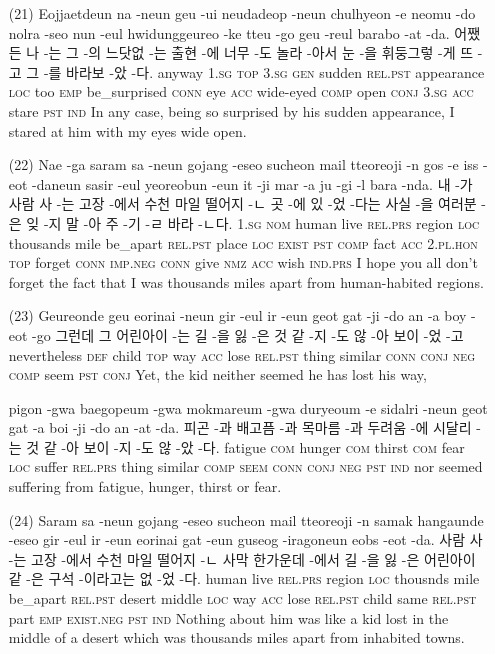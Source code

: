 \begin{itemize}
\item [(21)]
\tgl
		{Eojjaetdeun na -neun geu -ui neudadeop -neun chulhyeon -e neomu -do nolra -seo nun -eul hwidunggeureo -ke tteu -go geu -reul barabo -at -da.}
		{어쨌든 나 -는 그 -의 느닷없 -는 출현 -에 너무 -도 놀라 -아서 눈 -을 휘둥그렇 -게 뜨 -고 그 -를 바라보 -았 -다.}
		{anyway	\textsc{1.sg}	\textsc{top}	\textsc{3.sg}	\textsc{gen}	sudden	\textsc{rel.pst}	appearance	\textsc{loc}	too	\textsc{emp}	be\_surprised	\textsc{conn}	eye	\textsc{acc}	wide-eyed	\textsc{comp}	open	\textsc{conj}	\textsc{3.sg}	\textsc{acc}	stare	\textsc{pst}	\textsc{ind}}
		{In any case, being so surprised by his sudden appearance, I stared at him with my eyes wide open.}
		
\item [(22)]
\tgl
		{Nae -ga saram sa -neun gojang -eseo sucheon mail tteoreoji -n gos -e iss -eot -daneun sasir -eul yeoreobun -eun it -ji mar -a ju -gi -l bara -nda.}
		{내 -가 사람 사 -는 고장 -에서 수천 마일 떨어지 -ㄴ 곳 -에 있 -었 -다는 사실 -을 여러분 -은 잊 -지 말 -아 주 -기 -ㄹ 바라 -ㄴ다.}
		{\textsc{1.sg}	\textsc{nom}	human	live	\textsc{rel.prs}	region	\textsc{loc}	thousands	mile	be\_apart	\textsc{rel.pst}	place	\textsc{loc}	\textsc{exist}	\textsc{pst}	\textsc{comp}	fact	\textsc{acc}	\textsc{2.pl.hon}	\textsc{top}	forget	\textsc{conn}	\textsc{imp.neg}	\textsc{conn}	give	\textsc{nmz}	\textsc{acc}	wish	\textsc{ind.prs}}
		{I hope you all don't forget the fact that I was thousands miles apart from human-habited regions.}
		
\item [(23)]
\tgl
		{Geureonde geu eorinai -neun gir -eul ir -eun geot gat -ji -do an -a boy -eot -go}
		{그런데 그 어린아이 -는 길 -을 잃 -은 것 같 -지 -도 않 -아 보이 -었 -고}
		{nevertheless	\textsc{def}	child	\textsc{top}	way	\textsc{acc}	lose	\textsc{rel.pst}	thing	similar	\textsc{conn}	\textsc{conj}	\textsc{neg}	\textsc{comp}	seem	\textsc{pst}	\textsc{conj}}
		{Yet, the kid neither seemed he has lost his way,}
		
\tgl
		{pigon -gwa baegopeum -gwa mokmareum -gwa duryeoum -e sidalri -neun geot gat -a boi -ji -do an -at -da.}
		{피곤 -과 배고픔 -과 목마름 -과 두려움 -에 시달리 -는 것 같 -아 보이 -지 -도 않 -았 -다.}
		{fatigue	\textsc{com}	hunger	\textsc{com}	thirst	\textsc{com}	fear	\textsc{loc}	suffer	\textsc{rel.prs}	thing	similar	\textsc{comp}	\textsc{seem}	\textsc{conn}	\textsc{conj}	\textsc{neg}	\textsc{pst}	\textsc{ind}}
		{nor seemed suffering from fatigue, hunger, thirst or fear.}
		
\item [(24)]
\tgl
		{Saram sa -neun gojang -eseo sucheon mail tteoreoji -n samak hangaunde -eseo gir -eul ir -eun eorinai gat -eun guseog -iragoneun eobs -eot -da.}
		{사람 사 -는 고장 -에서 수천 마일 떨어지 -ㄴ 사막 한가운데 -에서 길 -을 잃 -은 어린아이 같 -은 구석 -이라고는 없 -었 -다.}
		{human	live	\textsc{rel.prs}	region	\textsc{loc}	thousnds	mile	be\_apart	\textsc{rel.pst}	desert	middle	\textsc{loc}	way	\textsc{acc}	lose	\textsc{rel.pst}	child	same	\textsc{rel.pst}	part	\textsc{emp}	\textsc{exist.neg}	\textsc{pst}	\textsc{ind}}
		{Nothing about him was like a kid lost in the middle of a desert which was thousands miles apart from inhabited towns.}
		

\end{itemize}

